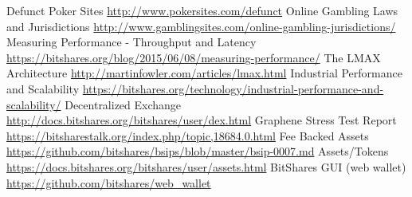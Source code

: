 \documentclass[a4paper,titlepage,final]{article}
\begin{document}
\newpage


\begin{thebibliography}{99}
\raggedright
{}
Defunct Poker Sites \url{http://www.pokersites.com/defunct} 
Online Gambling Laws and Jurisdictions \url{http://www.gamblingsites.com/online-gambling-jurisdictions/}
Measuring Performance - Throughput and Latency \url{https://bitshares.org/blog/2015/06/08/measuring-performance/}
The LMAX Architecture \url{http://martinfowler.com/articles/lmax.html}
Industrial Performance and Scalability \url{https://bitshares.org/technology/industrial-performance-and-scalability/}
Decentralized Exchange \url{http://docs.bitshares.org/bitshares/user/dex.html}
Graphene Stress Test Report \url{https://bitsharestalk.org/index.php/topic,18684.0.html}
Fee Backed Assets \url{https://github.com/bitshares/bsips/blob/master/bsip-0007.md}
Assets/Tokens \url{https://docs.bitshares.org/bitshares/user/assets.html}
BitShares GUI (web wallet) \url{https://github.com/bitshares/web_wallet}
\end{thebibliography}
\end{document}
